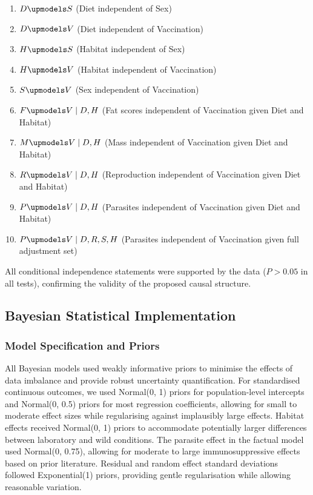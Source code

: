 \documentclass[a4paper, hidelinks, 11pt]{article}
\begin{document}
\begin{appendices}
	\begin{enumerate}
		\item $D \upmodels S$ (Diet independent of Sex)
		\item $D \upmodels V$ (Diet independent of Vaccination)
		\item $H \upmodels S$ (Habitat independent of Sex)
		\item $H \upmodels V$ (Habitat independent of Vaccination)
		\item $S \upmodels V$ (Sex independent of Vaccination)
		\item $F \upmodels V \mid D, H$ (Fat scores independent of Vaccination given Diet and Habitat)
		\item $M \upmodels V \mid D, H$ (Mass independent of Vaccination given Diet and Habitat)
		\item $R \upmodels V \mid D, H$ (Reproduction independent of Vaccination given Diet and Habitat)
		\item $P \upmodels V \mid D, H$ (Parasites independent of Vaccination given Diet and Habitat)
		\item $P \upmodels V \mid D, R, S, H$ (Parasites independent of Vaccination given full adjustment set)
	\end{enumerate}

	All conditional independence statements were supported by the data ($P > 0.05$ in all tests), confirming the validity of the proposed causal structure.

	\subsection{Bayesian Statistical Implementation}\label{supdata:BayesianImplementation}

	\subsubsection{Model Specification and Priors}\label{supdata:Priors}

	All Bayesian models used weakly informative priors to minimise the effects of data imbalance and provide robust uncertainty quantification. For standardised continuous outcomes, we used Normal(0, 1) priors for population-level intercepts and Normal(0, 0.5) priors for most regression coefficients, allowing for small to moderate effect sizes while regularising against implausibly large effects. Habitat effects received Normal(0, 1) priors to accommodate potentially larger differences between laboratory and wild conditions. The parasite effect in the factual model used Normal(0, 0.75), allowing for moderate to large immunosuppressive effects based on prior literature. Residual and random effect standard deviations followed Exponential(1) priors, providing gentle regularisation while allowing reasonable variation.


\end{appendices}
\end{document}
